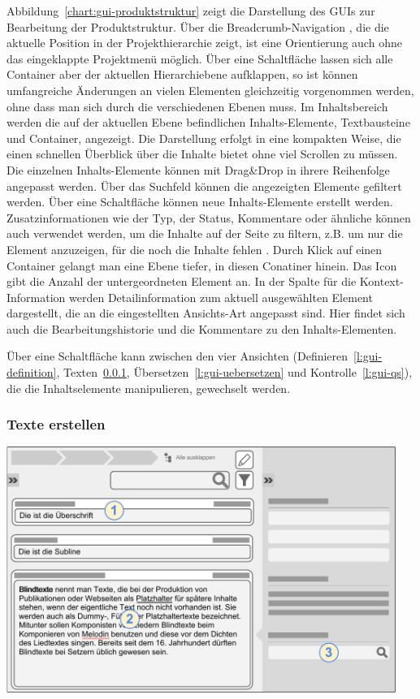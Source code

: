 Abbildung~\ref{chart:gui-produktstruktur} zeigt die Darstellung des GUIs zur Bearbeitung der Produktstruktur. Über die Breadcrumb-Navigation , die die aktuelle Position in der Projekthierarchie zeigt, ist eine Orientierung auch ohne das eingeklappte Projektmenü möglich. Über eine Schaltfläche lassen sich alle Container aber der aktuellen Hierarchiebene aufklappen, so ist können umfangreiche Änderungen an vielen Elementen gleichzeitig vorgenommen werden, ohne dass man sich durch die verschiedenen Ebenen  muss. Im Inhaltsbereich  werden die auf der aktuellen Ebene befindlichen Inhalts-Elemente, Textbausteine und Container, angezeigt. Die Darstellung erfolgt in eine kompakten Weise, die einen schnellen Überblick über die Inhalte bietet ohne viel Scrollen zu müssen. Die einzelnen Inhalts-Elemente können mit Drag\&Drop in ihrere Reihenfolge angepasst werden. Über das Suchfeld  können die angezeigten Elemente gefiltert werden. Über eine Schaltfläche  können neue Inhalts-Elemente erstellt werden. Zusatzinformationen wie der Typ, der Status, Kommentare oder ähnliche können auch verwendet werden, um die Inhalte auf der Seite zu filtern, z.B. um nur die Element anzuzeigen, für die noch die Inhalte fehlen . Durch Klick auf einen Container  gelangt man eine Ebene tiefer, in diesen Conatiner hinein. Das Icon gibt die Anzahl der untergeordneten Element an. In der Spalte für die Kontext-Information  werden Detailinformation zum aktuell ausgewählten Element dargestellt, die an die eingestellten Ansichts-Art angepasst sind. Hier findet sich auch die Bearbeitungshistorie und die Kommentare zu den Inhalts-Elementen.

Über eine Schaltfläche  kann zwischen den vier Ansichten (Definieren~\ref{l:gui-definition}, Texten~\ref{l:gui-texten}, Übersetzen~\ref{l:gui-uebersetzen} und Kontrolle~\ref{l:gui-qs}), die die Inhaltselemente manipulieren, gewechselt werden.

\subsubsection{Texte erstellen}\label{l:gui-texten}

\begin{center}
\includegraphics[width=0.95\textwidth]{media/GUITexteerstellen.pdf}
\label{chart:gui-texten}
\end{center}

